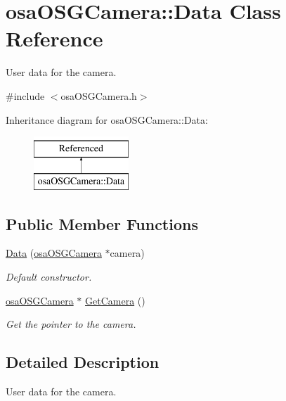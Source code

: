 \hypertarget{classosa_o_s_g_camera_1_1_data}{}\section{osa\+O\+S\+G\+Camera\+:\+:Data Class Reference}
\label{classosa_o_s_g_camera_1_1_data}


User data for the camera.  




{\ttfamily \#include $<$osa\+O\+S\+G\+Camera.\+h$>$}

Inheritance diagram for osa\+O\+S\+G\+Camera\+:\+:Data\+:\begin{figure}[H]
\begin{center}
\leavevmode
\includegraphics[height=2.000000cm]{d5/dca/classosa_o_s_g_camera_1_1_data}
\end{center}
\end{figure}
\subsection*{Public Member Functions}
\begin{DoxyCompactItemize}
\item 
\hyperlink{classosa_o_s_g_camera_1_1_data_a19e99cce8aef054ad75b99bca25318ca}{Data} (\hyperlink{classosa_o_s_g_camera}{osa\+O\+S\+G\+Camera} $\ast$camera)
\begin{DoxyCompactList}\small\item\em Default constructor. \end{DoxyCompactList}\item 
\hyperlink{classosa_o_s_g_camera}{osa\+O\+S\+G\+Camera} $\ast$ \hyperlink{classosa_o_s_g_camera_1_1_data_a01e705e7aaecee9187a0505087bd7c1a}{Get\+Camera} ()
\begin{DoxyCompactList}\small\item\em Get the pointer to the camera. \end{DoxyCompactList}\end{DoxyCompactItemize}


\subsection{Detailed Description}
User data for the camera. 

